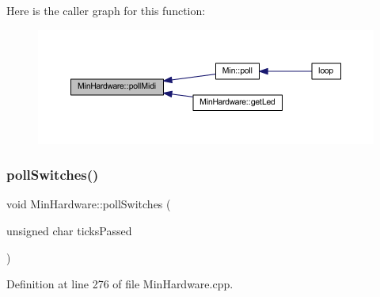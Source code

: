 Here is the caller graph for this function\+:
\nopagebreak
\begin{figure}[H]
\begin{center}
\leavevmode
\includegraphics[width=350pt]{d0/d93/class_min_hardware_a4978945a745e4c2690e05789eff52976_icgraph}
\end{center}
\end{figure}
\mbox{\label{class_min_hardware_a135650ade19c661a9e20f0a410722a10}} 
\subsubsection{\texorpdfstring{poll\+Switches()}{pollSwitches()}}
{\footnotesize\ttfamily void Min\+Hardware\+::poll\+Switches (\begin{DoxyParamCaption}\item[{unsigned char}]{ticks\+Passed }\end{DoxyParamCaption})}



Definition at line 276 of file Min\+Hardware.\+cpp.

